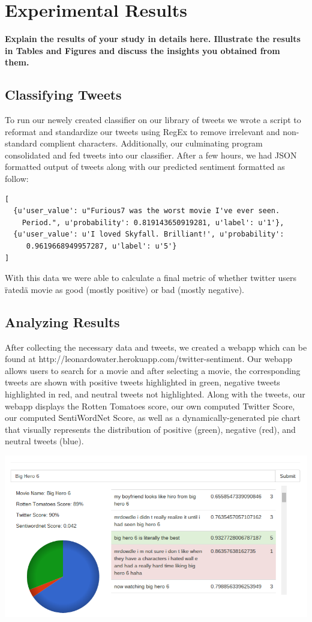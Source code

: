 \documentclass[12pt]{article}
\begin{document}
\section{Experimental Results}\label{S:2}
\textbf{Explain the results of your study in details here. Illustrate the results in Tables and Figures and discuss the insights you obtained from them.} \lipsum[1-9]
\subsection{Classifying Tweets}\label{S:3}
To run our newely created classifier on our library of tweets we wrote a script to reformat and standardize our tweets using RegEx to remove irrelevant and non-standard complient characters. Additionally, our culminating program consolidated and fed tweets into our classifier. After a few hours, we had JSON formatted output of tweets along with our predicted sentiment formatted as follow: 
\begin{verbatim}
[
  {u'user_value': u"Furious7 was the worst movie I've ever seen. 
  	Period.", u'probability': 0.819143650919281, u'label': u'1'}, 
  {u'user_value': u'I loved Skyfall. Brilliant!', u'probability':
  	 0.9619668949957287, u'label': u'5'}
]
\end{verbatim}
With this data we were able to calculate a final metric of whether twitter users \"rated\" a movie as good (mostly positive) or bad (mostly negative).
\subsection{Analyzing Results}\label{S:3}
After collecting the necessary data and tweets, we created a webapp which can be found at http://leonardowater.herokuapp.com/twitter-sentiment. Our webapp allows users to search for a movie and after selecting a movie, the corresponding tweets are shown with positive tweets highlighted in green, negative tweets highlighted in red, and neutral tweets not highlighted. Along with the tweets, our webapp displays the Rotten Tomatoes score, our own computed Twitter Score, our computed SentiWordNet Score, as well as a dynamically-generated pie chart that visually represents the distribution of positive (green), negative (red), and neutral tweets (blue).

\includegraphics[width=\textwidth]{app}
\end{document}
